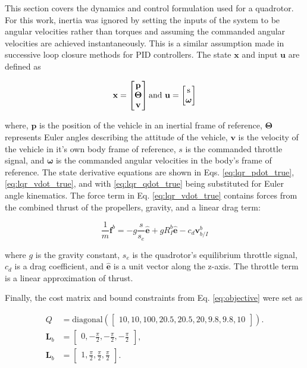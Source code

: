 \documentclass[letterpaper, 10 pt, conference]{ieeeconf}  %
\begin{document}
	This section covers the dynamics and control formulation used for a quadrotor. For this work, inertia was ignored by setting the inputs of the system to be angular velocities rather than torques and assuming the commanded angular velocities are achieved instantaneously. This is a similar assumption made in successive loop closure methods for PID controllers. The state $\mathbf{x}$ and input $\mathbf{u}$ are defined as
	
	\begin{equation}
	\label{eq:quad_xu}
	\mathbf{x}=\begin{bmatrix}\mathbf{p} \\ \boldsymbol{\Theta} \\ \mathbf{v} \end{bmatrix} \text{and}\ \mathbf{u}=\begin{bmatrix}$s$ \\ \boldsymbol{\omega} \end{bmatrix}
	\end{equation}
	
	where, $\mathbf{p}$ is the position of the vehicle in an inertial frame of reference, $\boldsymbol{\Theta}$ represents Euler angles describing the attitude of the vehicle, $\mathbf{v}$ is the velocity of the vehicle in it's own body frame of reference, $s$ is the commanded throttle signal, and $\boldsymbol{\omega}$ is the commanded angular velocities in the body's frame of reference. The state derivative equations are shown in Eqs. \ref{eq:lqr_pdot_true}, \ref{eq:lqr_vdot_true}, and with \ref{eq:lqr_qdot_true} being substituted for Euler angle kinematics. The force term in Eq. \ref{eq:lqr_vdot_true} contains forces from the combined thrust of the propellers, gravity, and a linear drag term:
	
	\begin{equation}
	\label{eq:quad_forces}
	\frac{1}{m}\mathbf{f}^b=-g\frac{s}{s_e}\hat{\mathbf{e}}+gR_I^b\hat{\mathbf{e}}-c_d\mathbf{v}^b_{b/I}
	\end{equation}
	
	where $g$ is the gravity constant, $s_e$ is the quadrotor's equilibrium throttle signal, $c_d$ is a drag coefficient, and $\hat{\mathbf{e}}$ is a unit vector along the z-axis. The throttle term is a linear approximation of thrust. 
	
	Finally, the cost matrix and bound constraints from Eq. \ref{eq:objective} were set as
	
	\begin{equation}
	\begin{aligned}
	Q &= \text{diagonal}(\begin{bmatrix}
	10,10,100,20.5,20.5,20,9.8,9.8,10
	\end{bmatrix}). \\
	\mathbf{L}_b &= \begin{bmatrix}
	0, -\frac{\pi}{2}, -\frac{\pi}{2}, -\frac{\pi}{2}
	\end{bmatrix}, \\
	\mathbf{L}_b &= \begin{bmatrix}
	1, \frac{\pi}{2}, \frac{\pi}{2}, \frac{\pi}{2}
	\end{bmatrix}.
	\end{aligned}
	\end{equation}
	
\end{document}
